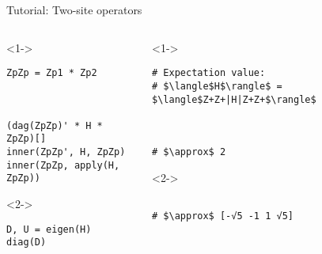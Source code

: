 \begin{frame}[fragile]{Tutorial: Two-site operators}


\begin{columns}

\begin{column}{5cm}

\begin{onlyenv}<1->

\begin{lstlisting}[language=JuliaLocal, style=julia, basicstyle=\small]
ZpZp = Zp1 * Zp2



(dag(ZpZp)' * H * ZpZp)[]
inner(ZpZp', H, ZpZp)
inner(ZpZp, apply(H, ZpZp))
\end{lstlisting}

\end{onlyenv}

\begin{onlyenv}<2->

\begin{lstlisting}[language=JuliaLocal, style=julia, basicstyle=\small]
D, U = eigen(H)
diag(D)
\end{lstlisting}

\end{onlyenv}

\end{column}

\begin{column}{5cm}

\begin{onlyenv}<1->

\begin{lstlisting}[style=julia, numbers=none, mathescape, basicstyle=\small]
# Expectation value:
# $\langle$H$\rangle$ = $\langle$Z+Z+|H|Z+Z+$\rangle$



# $\approx$ 2
 \end{lstlisting}

\end{onlyenv}

\begin{onlyenv}<2->

\begin{lstlisting}[style=julia, numbers=none, mathescape, basicstyle=\small]

# $\approx$ [-√5 -1 1 √5]
\end{lstlisting}

\end{onlyenv}

\end{column}

\end{columns}

\end{frame}

